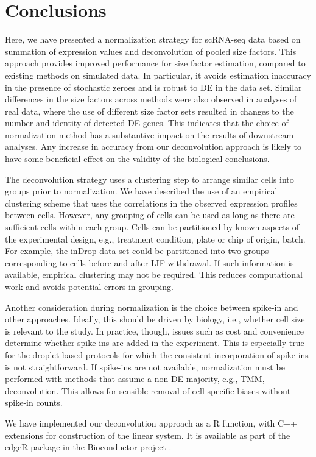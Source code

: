 \documentclass{article}
\begin{document}
\section{Conclusions}
Here, we have presented a normalization strategy for scRNA-seq data based on summation of expression values and deconvolution of pooled size factors.
This approach provides improved performance for size factor estimation, compared to existing methods on simulated data.
In particular, it avoids estimation inaccuracy in the presence of stochastic zeroes and is robust to DE in the data set.
Similar differences in the size factors across methods were also observed in analyses of real data,
    where the use of different size factor sets resulted in changes to the number and identity of detected DE genes.
This indicates that the choice of normalization method has a substantive impact on the results of downstream analyses.
Any increase in accuracy from our deconvolution approach is likely to have some beneficial effect on the validity of the biological conclusions.

The deconvolution strategy uses a clustering step to arrange similar cells into groups prior to normalization.
We have described the use of an empirical clustering scheme that uses the correlations in the observed expression profiles between cells.
However, any grouping of cells can be used as long as there are sufficient cells within each group.
Cells can be partitioned by known aspects of the experimental design, e.g., treatment condition, plate or chip of origin, batch.
For example, the inDrop data set could be partitioned into two groups corresponding to cells before and after LIF withdrawal.
If such information is available, empirical clustering may not be required.
This reduces computational work and avoids potential errors in grouping.

Another consideration during normalization is the choice between spike-in and other approaches.
Ideally, this should be driven by biology, i.e., whether cell size is relevant to the study.
In practice, though, issues such as cost and convenience determine whether spike-ins are added in the experiment.
This is especially true for the droplet-based protocols \cite{macosko2015highly,klein2015droplet} for which the consistent incorporation of spike-ins is not straightforward.
If spike-ins are not available, normalization must be performed with methods that assume a non-DE majority, e.g., TMM, deconvolution.
This allows for sensible removal of cell-specific biases without spike-in counts.

We have implemented our deconvolution approach as a R function, with C++ extensions for construction of the linear system.
It is available as part of the edgeR package in the Bioconductor project \cite{huber2015orchestrating}.



\end{document}
